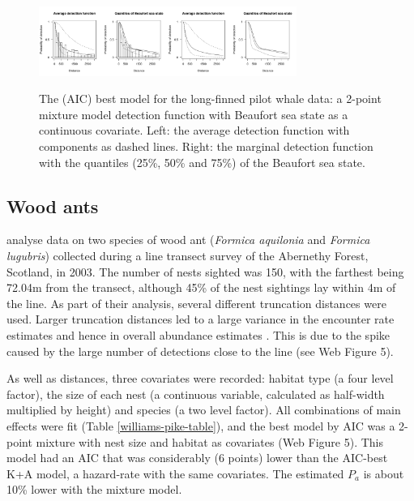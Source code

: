 \documentclass[useAMS,referee,usenatbib]{biom}
\begin{document}
\begin{figure}
\centering
\includegraphics[width=0.375\textwidth, trim= 0 0 3.8in 0, clip=true]{analyses/danpike-bssc.pdf}\includegraphics[width=0.375\textwidth, trim= 3.8in 0 0 0, clip=true]{analyses/danpike-bssc-hh.pdf}
\caption{The (AIC) best model for the long-finned pilot whale data: a 2-point mixture model detection function with Beaufort sea state as a continuous covariate. Left: the average detection function with components as dashed lines. Right: the marginal detection function with the quantiles (25\%, 50\% and 75\%) of the Beaufort sea state.}
\label{danpike-detfct}
\end{figure}


\subsection{Wood ants}
\label{s:woodant}

\cite{Borkin:2012vj} analyse data on two species of wood ant (\textit{Formica aquilonia} and \textit{Formica lugubris}) collected during a line transect survey of the Abernethy Forest, Scotland, in 2003. The number of nests sighted was 150, with the farthest being 72.04m from the transect, although 45\% of the nest sightings lay within 4m of the line. As part of their analysis, several different truncation distances were used. Larger truncation distances led to a large variance in the encounter rate estimates and hence in overall abundance estimates \citep[][]{Borkin:2012vj}. This is due to the spike caused by the large number of detections close to the line (see Web Figure 5).

As well as distances, three covariates were recorded: habitat type (a four level factor), the size of each nest (a continuous variable, calculated as half-width multiplied by height) and species (a two level factor). All combinations of main effects were fit (Table \ref{williams-pike-table}), and the best model by AIC was a 2-point mixture with nest size and habitat as covariates (Web Figure 5). This model had an AIC that was considerably (6 points) lower than the AIC-best K+A model, a hazard-rate with the same covariates.  The estimated $P_a$ is about 10\% lower with the mixture model.
\end{document}
